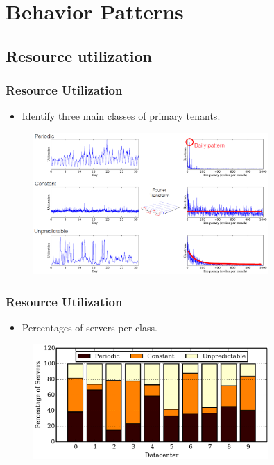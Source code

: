 \documentclass{beamer}
\begin{document}
\section{Behavior Patterns}

\subsection{Resource utilization}
	\begin{frame}
	\frametitle{Resource Utilization}
		\begin{itemize}
		\item Identify three main classes of primary tenants.
		\end{itemize}
		\begin{figure}[h!]
		\centering
		\includegraphics[width=0.8\textwidth]{./figure/pattern.PNG}
		\end{figure}
	\end{frame}

	\begin{frame}
	\frametitle{Resource Utilization}
		\begin{itemize}
		\item Percentages of servers per class.
		\end{itemize}
		\begin{figure}[h!]
		\centering
		\includegraphics[width=0.8\textwidth]{./figure/datacenter.PNG}
		\end{figure}
	\end{frame}
\end{document}
